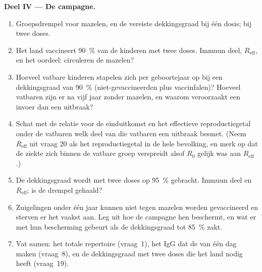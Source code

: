 \begin{problem}
\medskip
\noindent\textbf{Deel IV --- De campagne.}
\begin{enumerate}[resume]
  \item Groepsdrempel voor mazelen, en de vereiste dekkingsgraad bij
        één dosis; bij twee doses.
  \item Het land vaccineert \qty{90}{\%} van de kinderen met twee
        doses. Immuun deel, $R_{\text{eff}}$, en het oordeel:
        circuleren de mazelen?
  \item Hoeveel vatbare kinderen stapelen zich per geboortejaar op bij
        een dekkingsgraad van \qty{90}{\%} (niet-gevaccineerden plus
        vaccinfalen)? Hoeveel vatbaren zijn er na vijf jaar zonder
        mazelen, en waarom veroorzaakt een invoer dan een uitbraak?
  \item Schat met de relatie voor de einduitkomst en het effectieve
        reproductiegetal onder de vatbaren welk deel van die vatbaren
        een uitbraak besmet. (Neem $R_{\text{eff}}$ uit vraag 20 als
        het reproductiegetal in de hele bevolking, en merk op dat de
        ziekte zich binnen de vatbare groep verspreidt alsof $R_{0}$
        gelijk was aan $R_{\text{eff}}$.)
  \item De dekkingsgraad wordt met twee doses op \qty{95}{\%} gebracht.
        Immuun deel en $R_{\text{eff}}$; is de drempel gehaald?
  \item Zuigelingen onder één jaar kunnen niet tegen mazelen worden
        gevaccineerd en sterven er het vaakst aan. Leg uit hoe de
        campagne hen beschermt, en wat er met hun bescherming gebeurt
        als de dekkingsgraad tot \qty{85}{\%} zakt.
  \item Vat samen: het totale repertoire (vraag~1), het IgG dat de
         van één dag maken (vraag~8), en de dekkingsgraad
        met twee doses die het land nodig heeft (vraag~19).
\end{enumerate}
\end{problem}
